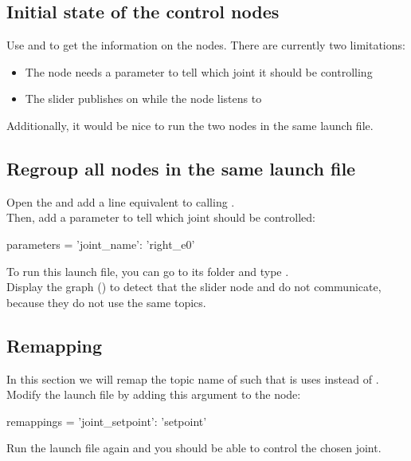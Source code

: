 \documentclass{ecnreport}
\begin{document}
\subsection{Initial state of the control nodes}

Use  and  to get the information on the nodes. There are currently two limitations:
\begin{itemize}
 \item The  node needs a parameter to tell which joint it should be controlling
 \item The slider publishes on  while the   node listens to 
\end{itemize}
Additionally, it would be nice to run the two nodes in the same launch file.

\subsection{Regroup all nodes in the same launch file}

Open the  and add a line equivalent to calling .\\
Then, add a parameter to tell which joint should be controlled:
\begin{pythoncode}
 parameters = {'joint_name': 'right_e0'}
\end{pythoncode}


To run this launch file, you can go to its folder and type .\\
Display the graph () to detect that the slider node and  do not communicate, because they do not use the same topics.

\subsection{Remapping}

In this section we will remap the topic name of  such that is uses  instead of .\\

Modify the launch file by adding this argument to the  node:

\begin{pythoncodelarge}
remappings = {'joint_setpoint': 'setpoint'}
\end{pythoncodelarge}
Run the launch file again and you should be able to control the chosen joint.
\end{document}
